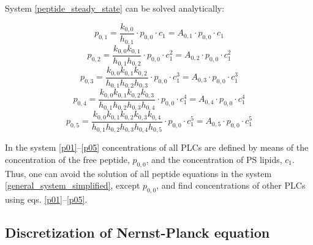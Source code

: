 System \eqref{peptide_steady_state} can be solved analytically:

\begin{equation}
 \label {p01} p_{0,1} = \frac{k_{0,0}}{h_{0,1}}\cdot p_{0,0} \cdot c_1 = A_{0,1}\cdot p_{0,0} \cdot c_1
\end{equation}
\begin{equation}
 \label {p02} p_{0,2} = \frac{k_{0,0}k_{0,1}}{h_{0,1}h_{0,2}}\cdot p_{0,0} \cdot c_1^2 = A_{0,2}\cdot p_{0,0} \cdot c_1^2
\end{equation}
\begin{equation}
 \label {p03} p_{0,3} = \frac{k_{0,0}k_{0,1}k_{0,2}}{h_{0,1}h_{0,2}h_{0,3}}\cdot p_{0,0} \cdot c_1^3 = A_{0,3}\cdot p_{0,0} \cdot c_1^3
\end{equation}
\begin{equation}
 \label {p04} p_{0,4} = \frac{k_{0,0}k_{0,1}k_{0,2}k_{0,3}}{h_{0,1}h_{0,2}h_{0,3}h_{0,4}}\cdot p_{0,0} \cdot c_1^4 = A_{0,4}\cdot p_{0,0} \cdot c_1^4
\end{equation}
\begin{equation}
 \label {p05} p_{0,5} = \frac{k_{0,0}k_{0,1}k_{0,2}k_{0,3}k_{0,4}}{h_{0,1}h_{0,2}h_{0,3}h_{0,4}h_{0,5}}\cdot p_{0,0} \cdot c_1^5 = A_{0,5}\cdot p_{0,0} \cdot c_1^5
\end{equation}

In the system \eqref{p01}--\eqref{p05} concentrations of all PLCs are defined by means of the concentration of the free peptide, $p_{0,0}$, and the concentration of PS lipids, $c_1$. Thus, one can avoid the solution of all peptide equations in the system \eqref{general_system_simplified}, except $p_{0,0}$, and find concentrations of other PLCs using eqs. \eqref{p01}--\eqref{p05}.

\subsection{Discretization of Nernst-Planck equation}

\label{nernst_planck_discretization}

